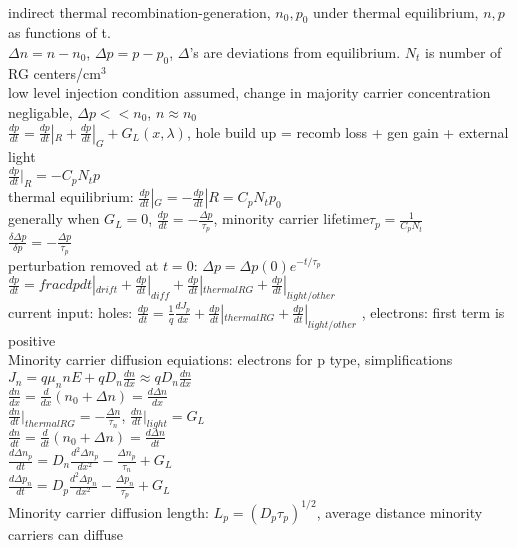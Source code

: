 \documentclass{article}
\begin{document}
\begin{large}
\\indirect thermal recombination-generation, $n_0, p_0$ under thermal equilibrium, $n, p$ as functions of t.
\\$\Delta n=n-n_0$, $\Delta p=p-p_0$, $\Delta$'s are deviations from equilibrium. $N_t$ is number of RG centers/cm$^3$
\\low level injection condition assumed, change in majority carrier concentration negligable, $\Delta p<<n_0$, $n\approx n_0$
\\$\frac{dp}{dt}=\frac{dp}{dt}|_R+\frac{dp}{dt}|_G+G_L(x,\lambda)$, hole build up = recomb loss + gen gain + external light
\\$\frac{dp}{dt}|_R=-C_pN_tp$
\\thermal equilibrium: $\frac{dp}{dt}|_G=-\frac{dp}{dt}|R=C_pN_tp_0$
\\generally when $G_L=0$, $\frac{dp}{dt}=-\frac{\Delta p}{\tau_p}$, minority carrier lifetime$\tau_p=\frac{1}{C_pN_t}$
\\$\frac{\delta\Delta p}{\delta p}=-\frac{\Delta p}{\tau_p}$
\\perturbation removed at $t=0$: $\Delta p=\Delta p(0)e^{-t/\tau_p}$
\\$\frac{dp}{dt}=frac{dp}{dt}|_{drift}+\frac{dp}{dt}|_{diff}+\frac{dp}{dt}|_{thermal RG}+\frac{dp}{dt}|_{light/other}$
\\current input: holes: $\frac{dp}{dt}=\frac{1}{q}\frac{d J_p}{dx}+\frac{dp}{dt}|_{thermal RG}+\frac{dp}{dt}|_{light/other}$ , electrons: first term is positive
\\Minority carrier diffusion equiations:  electrons for p type, simplifications
\\$J_n=q\mu_nnE+qD_n\frac{dn}{dx}\approx qD_n\frac{dn}{dx}$
\\$\frac{dn}{dx}=\frac{d}{dx}(n_0+\Delta n)=\frac{d\Delta n}{dx}$
\\$\frac{dn}{dt}|_{thermal RG} = -\frac{\Delta n}{\tau_n}$,   $\frac{dn}{dt}|_{light}=G_L$
\\$\frac{dn}{dt}=\frac{d}{dt}(n_0+\Delta n)=\frac{d\Delta n}{dt}$
\\$\frac{d\Delta n_p}{dt}=D_n\frac{d^2\Delta n_p}{dx^2}-\frac{\Delta n_p}{\tau_n}+G_L$
\\$\frac{d\Delta p_n}{dt}=D_p\frac{d^2\Delta p_n}{dx^2}-\frac{\Delta p_n}{\tau_p}+G_L$
\\Minority carrier diffusion length: $L_p=(D_p\tau_p)^{1/2}$, average distance minority carriers can diffuse




\end{large}
\end{document}
